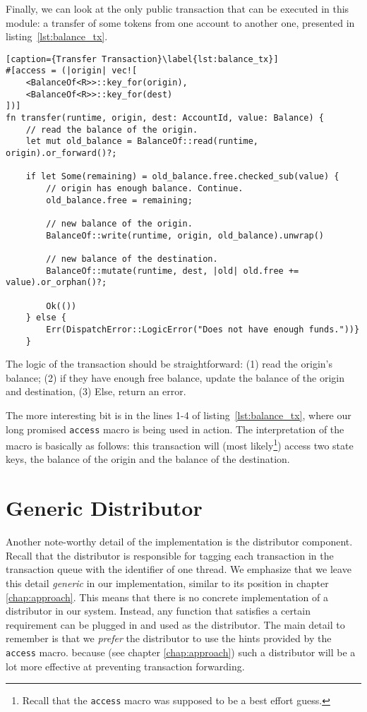 Finally, we can look at the only public transaction that can be executed in this module: a transfer
of some tokens from one account to another one, presented in listing~\ref{lst:balance_tx}.

\begin{lstlisting}[caption={Transfer Transaction}\label{lst:balance_tx}]
#[access = (|origin| vec![
	<BalanceOf<R>>::key_for(origin),
	<BalanceOf<R>>::key_for(dest)
])]
fn transfer(runtime, origin, dest: AccountId, value: Balance) {
	// read the balance of the origin.
	let mut old_balance = BalanceOf::read(runtime, origin).or_forward()?;

	if let Some(remaining) = old_balance.free.checked_sub(value) {
		// origin has enough balance. Continue.
		old_balance.free = remaining;

		// new balance of the origin.
		BalanceOf::write(runtime, origin, old_balance).unwrap()

		// new balance of the destination.
		BalanceOf::mutate(runtime, dest, |old| old.free += value).or_orphan()?;

		Ok(())
	} else {
		Err(DispatchError::LogicError("Does not have enough funds."))}
	}
\end{lstlisting}

The logic of the transaction should be straightforward: (1) read the origin's balance; (2) if they have
enough free balance, update the balance of the origin and destination, (3) Else, return an error.

The more interesting bit is in the lines 1-4 of listing~\ref{lst:balance_tx}, where our long promised \texttt{access} macro is being
used in action. The interpretation of the macro is basically as follows: this transaction will (most
likely\footnote{Recall that the \texttt{access} macro was supposed to be a best effort guess.})
access two state keys, the balance of the origin and the balance of the destination.

\section{Generic Distributor}

Another note-worthy detail of the implementation is the distributor component. Recall that the
distributor is responsible for tagging each transaction in the transaction queue with the identifier
of one thread. We emphasize that we leave this detail \textit{generic} in our implementation, similar
to its position in chapter \ref{chap:approach}. This means that there is no concrete implementation
of a distributor in our system. Instead, any function that satisfies a certain requirement can be
plugged in and used as the distributor. The main detail to remember is that we \textit{prefer} the
distributor to use the hints provided by the \texttt{access} macro. because (see
chapter \ref{chap:approach}) such a distributor will be a lot more effective at preventing
transaction forwarding.

